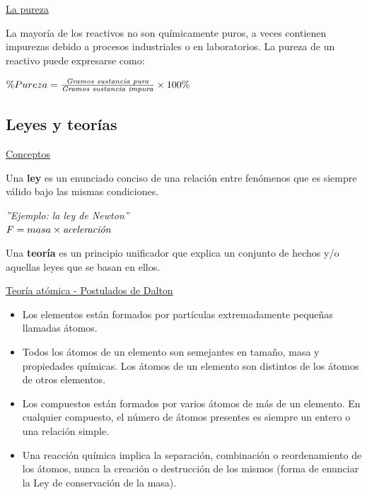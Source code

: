             \begin{center} \underline{La pureza} \end{center}
                \indent La mayoría de los reactivos no son químicamente puros, a veces contienen impurezas debido a procesos industriales o en laboratorios. La pureza de un reactivo puede expresarse como:
                \begin{center} 
                    $\% Pureza = \frac{\text{\textit{Gramos sustancia pura}}}{\text{\textit{Gramos sustancia impura}}} \times 100 \%$
                \end{center}

    \subsection{Leyes y teorías}
        \begin{center} \underline{Conceptos} \end{center}
            \indent Una \textbf{ley} es un enunciado conciso de una relación entre fenómenos que es siempre válido bajo las mismas condiciones. 
            \begin{center} \textit{''Ejemplo: la ley de Newton''} \\[5pt] \textcolor{red}{$F = masa \times \text{\textit{aceleración}}$} \\[10pt] \end{center}
            \saltoPag%

            \indent Una \textbf{teoría} es un principio unificador que explica un conjunto de hechos y/o aquellas leyes que se basan en ellos.

            \begin{center} \underline{Teoría atómica - Postulados de Dalton} \end{center}
                \begin{itemize}
                    \item Los elementos están formados por partículas extremadamente pequeñas llamadas átomos.
                    \item Todos los átomos de un elemento son semejantes en tamaño, masa y propiedades químicas. Los átomos de un elemento son distintos de los átomos de otros elementos.
                    \item Los compuestos están formados por varios átomos de más de un elemento. En cualquier compuesto, el número de átomos presentes es siempre un entero o una relación simple.
                    \item Una reacción química implica la separación, combinación o reordenamiento de los átomos, nunca la creación o destrucción de los mismos (forma de enunciar la Ley de conservación de la masa).
                \end{itemize}

